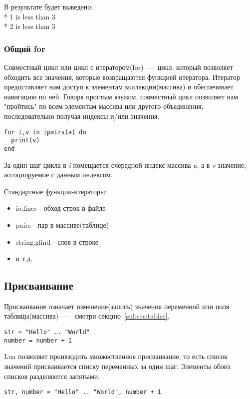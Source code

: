 В результате будет выведено: 
\\* 1 is less than 3
\\* 2 is less than 3

\subsubsection{Общий for}

Совместный цикл или цикл с итератором(for)~---~цикл, который позволяет обходить все значения, которые возвращаются функцией итератора. Итератор предоставляет нам доступ к элементам коллекции(массива) и обеспечивает навигацию по ней. Говоря простым языком, совместный цикл позволяет нам "пройтись" по всем элементам массива или другого объединения, последовательно получая индексы и/или значения. 

\begin{lstlisting}
for i,v in ipairs(a) do 
  print(v) 
end
\end{lstlisting}

За один шаг цикла в \emph{i} помещается очередной индекс массива \emph{a}, а в \emph{v} значение, ассоциируемое с данным индексом. 

Стандартные функции-итераторы:
\begin{itemize}
	\item io.lines - обход строк в файле
	\item pairs - пар в массиве(таблице)
	\item string.gfind - слов в строке 
	\item и т.д.
\end{itemize}

  
\subsection{Присваивание}

Присваивание означает изменение(запись) значения переменной или поля таблицы(массива)~---~ смотри секцию~\ref{subsec:tables}.

\begin{lstlisting}
str = "Hello" .. "World"
number = number + 1
\end{lstlisting}

Lua позволяет проивзодить множественное присваивание, то есть список значений присваивается списку переменных за один шаг. Элементы обоиз списков разделяются запятыми. 

\begin{lstlisting}
str, number = "Hello" .. "World", number + 1
\end{lstlisting}

